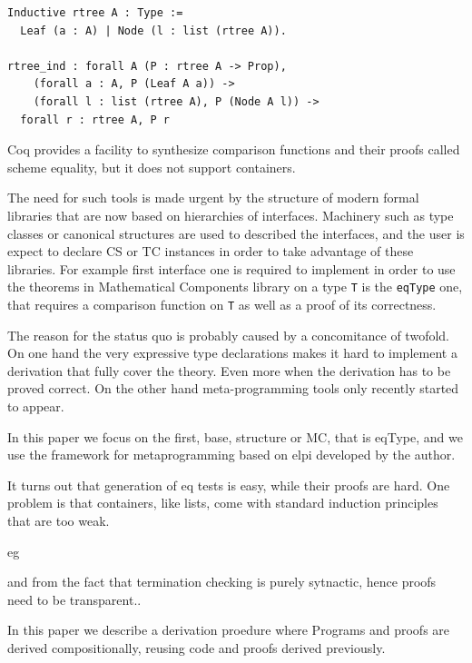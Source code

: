 \documentclass[sigplan,10pt,review]{acmart}\settopmatter{printfolios=true,printccs=false,printacmref=false}
\begin{document}
\begin{lstlisting}
Inductive rtree A : Type :=
  Leaf (a : A) | Node (l : list (rtree A)).

rtree_ind : forall A (P : rtree A -> Prop),
    (forall a : A, P (Leaf A a)) ->
    (forall l : list (rtree A), P (Node A l)) ->
  forall r : rtree A, P r
\end{lstlisting}

Coq provides a facility to synthesize comparison functions and their proofs
called scheme equality, but it does not support containers.


The need for such tools is made urgent by the structure of
modern formal libraries that are now based on hierarchies of
interfaces. Machinery such as type classes or canonical structures
are used to described the interfaces, and the user is expect to
declare CS or TC instances in order to take advantage of these libraries.
For example first interface one is
required to implement in order to use the theorems in Mathematical
Components library on a type \verb+T+ is the
\verb+eqType+ one, that requires a comparison function on \verb+T+ as
well as a proof of its correctness.

The reason for the status quo is probably caused by a concomitance of
twofold. On one hand the very
expressive type declarations makes it hard to implement a derivation
that fully cover the theory. Even more when the derivation has to be proved
correct. On the other hand meta-programming tools only recently started to appear.

In this paper we focus on the first, base, structure or MC, that is eqType, and
we use the framework for metaprogramming based on elpi developed by the author.

It turns out that generation of eq tests is easy, while their proofs are hard.
One problem is that containers, like lists, come with standard induction principles that are too weak.

eg

and from the fact that termination checking is purely sytnactic, hence 
proofs need to be transparent..

In this paper we describe a derivation proedure where Programs and proofs
are derived compositionally, reusing code and proofs derived previously.
\end{document}
